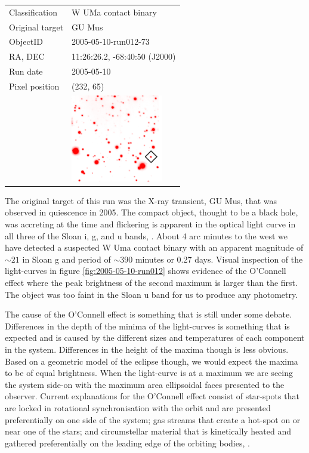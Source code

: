   \begin{tabular}{l l}
  Classification & {W UMa} contact binary \\
  Original target & GU Mus \\
  ObjectID & 2005-05-10-run012-73 \\
  RA, DEC & 11:26:26.2, -68:40:50 (J2000) \\
  Run date & 2005-05-10 \\
  Pixel position & (232, 65) \\
   & \includegraphics[width=40mm]{images/2005-05-10-run012-73.png} \\
  \end{tabular}
  
The original target of this run was the X-ray transient, {GU Mus}, that was observed in quiescence in 2005. The compact object, thought to be a black hole, was accreting at the time and flickering is apparent in the optical light curve in all three of the Sloan i, g, and u bands, \citep{tariq2010}. About 4 arc minutes to the west we have detected a suspected {W Uma} contact binary with an apparent magnitude of $\sim21$ in Sloan g and period of $\sim 390$ minutes or 0.27 days. Visual inspection of the light-curves in figure \ref{fig:2005-05-10-run012} shows evidence of the O'Connell effect where the peak brightness of the second maximum is larger than the first. The object was too faint in the Sloan u band for us to produce any photometry. 

The cause of the O'Connell effect is something that is still under some debate. Differences in the depth of the minima of the light-curves is something that is expected and is caused by the different sizes and temperatures of each component in the system. Differences in the height of the maxima though is less obvious. Based on a geometric model of the eclipse though, we would expect the maxima to be of equal brightness. When the light-curve is at a maximum we are seeing the system side-on with the maximum area ellipsoidal faces presented to the observer. Current explanations for the O'Connell effect consist of star-spots that are locked in rotational synchronisation with the orbit and are presented preferentially on one side of the system; gas streams that create a hot-spot on or near one of the stars; and circumstellar material that is kinetically heated and gathered preferentially on the leading edge of the orbiting bodies, \citep{oconnelleffect}.  

